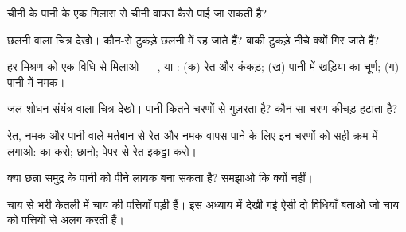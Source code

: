 \begin{exercise}[$\star$]\label{exo:g3:separating-mixtures:5}
चीनी के पानी के एक गिलास से चीनी वापस कैसे पाई जा सकती है?
\end{exercise}

\begin{exercise}[$\star$]\label{exo:g3:separating-mixtures:6}
छलनी वाला चित्र देखो। कौन-से टुकड़े छलनी में रह जाते हैं? बाकी टुकड़े
नीचे क्यों गिर जाते हैं?
\end{exercise}

\begin{exercise}[$\star$]\label{exo:g3:separating-mixtures:7}
हर मिश्रण को एक विधि से मिलाओ --- ,  या :
(क) रेत और कंकड़; (ख) पानी में खड़िया का चूर्ण; (ग) पानी में नमक।
\end{exercise}

\begin{exercise}[$\star$]\label{exo:g3:separating-mixtures:8}
जल-शोधन संयंत्र वाला चित्र देखो। पानी कितने चरणों से गुज़रता है?
कौन-सा चरण कीचड़ हटाता है?
\end{exercise}

\begin{exercise}[$\star$]\label{exo:g3:separating-mixtures:9}
रेत, नमक और पानी वाले मर्तबान से रेत और नमक वापस पाने के लिए इन चरणों
को सही क्रम में लगाओ:  का  करो; छानो; पेपर से रेत
इकट्ठा करो।
\end{exercise}

\begin{exercise}[$\star\star$]\label{exo:g3:separating-mixtures:10}
क्या छन्ना समुद्र के पानी को पीने लायक बना सकता है? समझाओ कि क्यों नहीं।
\end{exercise}

\begin{exercise}[$\star\star$]\label{exo:g3:separating-mixtures:11}
चाय से भरी केतली में चाय की पत्तियाँ पड़ी हैं। इस अध्याय में देखी गई
ऐसी दो विधियाँ बताओ जो चाय को पत्तियों से अलग करती हैं।
\end{exercise}
